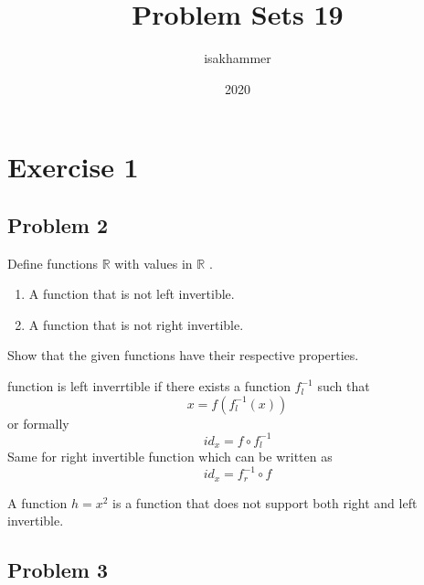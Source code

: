 \documentclass{article}
\title{Problem Sets 19}
\author{isakhammer }
\date{2020}
\theoremstyle{remark}
\newcommand{\newpara}
  {
  \vskip 0.4cm
  }
\begin{document}
\maketitle
\tableofcontents
\newpage

\newpage
\section{Exercise 1}%
\label{sec:exercise_1}

\subsection{Problem 2}%
\label{sub:problem_2}

Define functions $\mathbb{R} $ with values in $\mathbb{R} $ .
\begin{enumerate}
  \item A function that is not left invertible.
  \item A function that is not right invertible.
\end{enumerate}


Show that the given functions have their respective properties.

\newpara
\begin{tcolorbox}
  
 function is left inverrtible if there exists a function $f^{-1}_{l}$ such that \[
x = f\left( f_{l}^{-1}\left( x \right) \right) 
\] 
or formally \[
id_{x} = f \circ f_{l}^{-1}
\] 
Same for right invertible function which can be written as \[
id_{x} = f_{r}^{-1} \circ  f 
\] 
\end{tcolorbox}

\newpara
A function $h=x^2$ is a function that does not support both right and left invertible. 


\subsection{Problem 3}%
\label{sub:problem_3}
\end{document}
